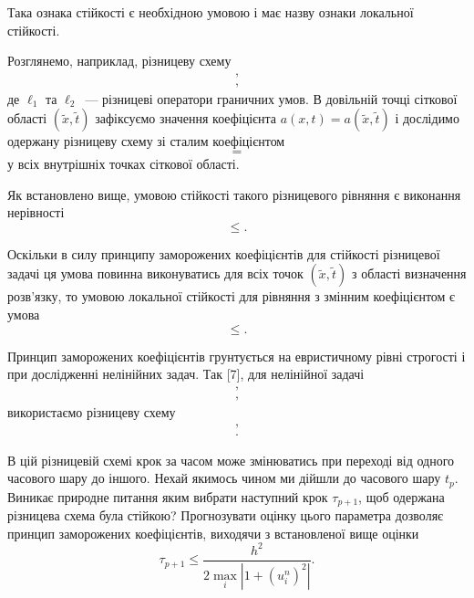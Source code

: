 Така ознака стійкості є необхідною умовою і має назву ознаки локальної стійкості. \medskip

Розглянемо, наприклад, різницеву схему
\begin{gather}
    \label{eq:6.1}
    , \\
    ,
\end{gather}
де $\ell_1$ та $\ell_2$~--- різницеві оператори граничних умов. В довільній точці сіткової області $(\tilde x, \tilde t)$ зафіксуємо значення коефіцієнта $a(x, t) = a(\tilde x, \tilde t)$ і дослідимо одержану різницеву схему зі сталим коефіцієнтом
\begin{equation}
    =
\end{equation}
у всіх внутрішніх точках сіткової області. \medskip

Як встановлено вище, умовою стійкості такого різницевого рівняння є виконання нерівності
\begin{equation*}
    \le .
\end{equation*}

Оскільки в силу принципу заморожених коефіцієнтів для стійкості різницевої задачі ця умова повинна виконуватись для всіх точок $(\tilde x, \tilde t)$ з області визначення розв'язку, то умовою локальної стійкості для рівняння з змінним коефіцієнтом є умова
\begin{equation*}
    \le .
\end{equation*}

Принцип заморожених коефіцієнтів грунтується на евристичному рівні строгості і при дослідженні нелінійних задач. Так [7], для нелінійної задачі
\begin{gather*}
    , \\
    ,
\end{gather*}
використаємо різницеву схему
\begin{gather*}
    , \\
    .
\end{gather*}

В цій різницевій схемі крок за часом може змінюватись при переході від одного часового шару до іншого. Нехай якимось чином ми дійшли до часового шару $t_p$. Виникає природне питання яким вибрати наступний крок $\tau_{p+1}$, щоб одержана різницева схема була стійкою? Прогнозувати оцінку цього параметра дозволяє принцип заморожених коефіцієнтів, виходячи з встановленої вище оцінки
\begin{equation*}
    \tau_{p+1} \le \frac{h^2}{2 \max_i |1 + (u_i^n)^2|}.
\end{equation*}

